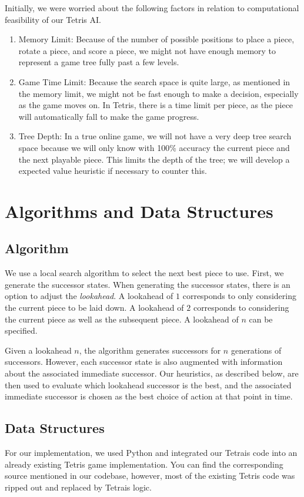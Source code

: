 \documentclass[12pt]{article}
\begin{document}
Initially, we were worried about the following factors in relation to computational feasibility of our Tetris AI.
\begin{enumerate}
\item Memory Limit: Because of the number of possible positions to place a piece, rotate a piece, and score a piece, we might not have enough memory to represent a game tree fully past a few levels.
\item Game Time Limit: Because the search space is quite large, as mentioned in the memory limit, we might not be fast enough to make a decision, especially as the game moves on. In Tetris, there is a time limit per piece, as the piece will automatically fall to make the game progress.
\item Tree Depth: In a true online game, we will not have a very deep tree search space because we will only know with 100\% accuracy the current piece and the next playable piece. This limits the depth of the tree; we will develop a expected value heuristic if necessary to counter this.
\end{enumerate}


\section{Algorithms and Data Structures}
\subsection{Algorithm}
We use a local search algorithm to select the next best piece to use. First, we generate the successor states. When generating the successor states, there is an option to adjust the \textit{lookahead}. A lookahead of $1$ corresponds to only considering the current piece to be laid down. A lookahead of $2$ corresponds to considering the current piece as well as the subsequent piece. A lookahead of $n$ can be specified.

Given a lookahead $n$, the algorithm generates successors for $n$ generations of successors. However, each successor state is also augmented with information about the associated immediate successor. Our heuristics, as described below, are then used to evaluate which lookahead successor is the best, and the associated immediate successor is chosen as the best choice of action at that point in time.

\subsection{Data Structures}
For our implementation, we used Python and integrated our Tetrais code into an already existing Tetris game implementation. You can find the corresponding source mentioned in our codebase, however, most of the existing Tetris code was ripped out and replaced by Tetrais logic. 
\end{document}

